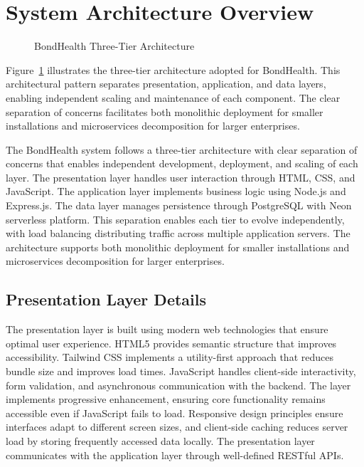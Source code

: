 \section{System Architecture Overview}

\begin{figure}[h]
\centering
{}
\caption{BondHealth Three-Tier Architecture}
\label{fig:architecture}
\end{figure}

\noindent Figure~\ref{fig:architecture} illustrates the three-tier architecture adopted for BondHealth. This architectural pattern separates presentation, application, and data layers, enabling independent scaling and maintenance of each component. The clear separation of concerns facilitates both monolithic deployment for smaller installations and microservices decomposition for larger enterprises.

\justifying
\noindent The BondHealth system follows a three-tier architecture with clear separation of concerns that enables independent development, deployment, and scaling of each layer. The presentation layer handles user interaction through HTML, CSS, and JavaScript. The application layer implements business logic using Node.js and Express.js. The data layer manages persistence through PostgreSQL with Neon serverless platform. This separation enables each tier to evolve independently, with load balancing distributing traffic across multiple application servers. The architecture supports both monolithic deployment for smaller installations and microservices decomposition for larger enterprises.

\subsection{Presentation Layer Details}

\justifying
\noindent The presentation layer is built using modern web technologies that ensure optimal user experience. HTML5 provides semantic structure that improves accessibility. Tailwind CSS implements a utility-first approach that reduces bundle size and improves load times. JavaScript handles client-side interactivity, form validation, and asynchronous communication with the backend. The layer implements progressive enhancement, ensuring core functionality remains accessible even if JavaScript fails to load. Responsive design principles ensure interfaces adapt to different screen sizes, and client-side caching reduces server load by storing frequently accessed data locally. The presentation layer communicates with the application layer through well-defined RESTful APIs.

